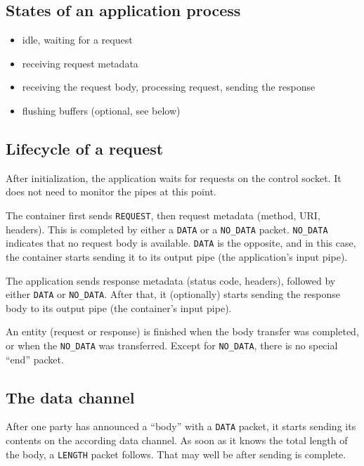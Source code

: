 \documentclass[a4paper,12pt]{article}
\begin{document}
\subsection{States of an application process}

\begin{itemize}
\item idle, waiting for a request
\item receiving request metadata
\item receiving the request body, processing request, sending the
  response
\item flushing buffers (optional, see below)
\end{itemize}

\subsection{Lifecycle of a request}

After initialization, the application waits for requests on the
control socket.  It does not need to monitor the pipes at this point.

The container first sends \texttt{REQUEST}, then request metadata
(method, URI, headers).  This is completed by either a \texttt{DATA}
or a \texttt{NO\_DATA} packet.  \texttt{NO\_DATA} indicates that no
request body is available.  \texttt{DATA} is the opposite, and in this
case, the container starts sending it to its output pipe (the
application's input pipe).

The application sends response metadata (status code, headers),
followed by either \texttt{DATA} or \texttt{NO\_DATA}.  After that, it
(optionally) starts sending the response body to its output pipe (the
container's input pipe).

An entity (request or response) is finished when the body transfer was
completed, or when the \texttt{NO\_DATA} was transferred.  Except for
\texttt{NO\_DATA}, there is no special ``end'' packet.

\subsection{The data channel}

After one party has announced a ``body'' with a \texttt{DATA} packet,
it starts sending its contents on the according data channel.  As soon
as it knows the total length of the body, a \texttt{LENGTH} packet
follows.  That may well be after sending is complete.
\end{document}
